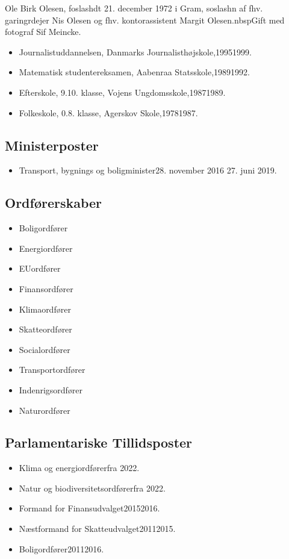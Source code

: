 \documentclass[11pt, a4paper]{awesome-cv}
\begin{document}
\makecvheader[R]
\makelettertitle
\begin{cvletter}
Ole Birk Olesen, foslashdt 21. december 1972 i Gram, soslashn af fhv. garingrdejer Nis Olesen og fhv. kontorassistent Margit Olesen.nbspGift med fotograf Sif Meincke.

\begin{itemize}
\item Journalistuddannelsen, Danmarks Journalisthøjskole,19951999.
\item Matematisk studentereksamen, Aabenraa Statsskole,19891992.
\item Efterskole, 9.10. klasse, Vojens Ungdomsskole,19871989.
\item Folkeskole, 0.8. klasse, Agerskov Skole,19781987.
\end{itemize}
\subsection*{Ministerposter}
\begin{itemize}
\item Transport, bygnings og boligminister28. november 2016  27. juni 2019.
\end{itemize}
\subsection*{Ordførerskaber}
\begin{itemize}
\item Boligordfører
\item Energiordfører
\item EUordfører
\item Finansordfører
\item Klimaordfører
\item Skatteordfører
\item Socialordfører
\item Transportordfører
\item Indenrigsordfører
\item Naturordfører
\end{itemize}
\subsection*{Parlamentariske Tillidsposter}
\begin{itemize}
\item Klima og energiordførerfra 2022.
\item Natur og biodiversitetsordførerfra 2022.
\item Formand for Finansudvalget20152016.
\item Næstformand for Skatteudvalget20112015.
\item Boligordfører20112016.
\end{itemize}

\end{cvletter}
\end{document}
